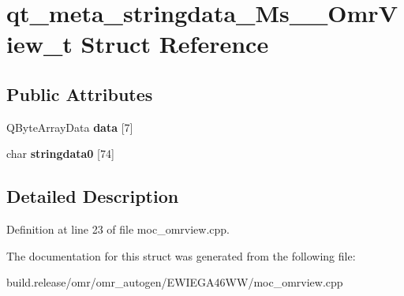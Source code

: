 \hypertarget{structqt__meta__stringdata___ms_____omr_view__t}{}\section{qt\+\_\+meta\+\_\+stringdata\+\_\+\+Ms\+\_\+\+\_\+\+Omr\+View\+\_\+t Struct Reference}
\label{structqt__meta__stringdata___ms_____omr_view__t}
\subsection*{Public Attributes}
\begin{DoxyCompactItemize}
\item 
\mbox{\label{structqt__meta__stringdata___ms_____omr_view__t_a4c301e0b39d02dceb82f9a6101306863}} 
Q\+Byte\+Array\+Data {\bfseries data} \mbox{[}7\mbox{]}
\item 
\mbox{\label{structqt__meta__stringdata___ms_____omr_view__t_ae32644befb5b959052d218ae6d5b726e}} 
char {\bfseries stringdata0} \mbox{[}74\mbox{]}
\end{DoxyCompactItemize}


\subsection{Detailed Description}


Definition at line 23 of file moc\+\_\+omrview.\+cpp.



The documentation for this struct was generated from the following file\+:\begin{DoxyCompactItemize}
\item 
build.\+release/omr/omr\+\_\+autogen/\+E\+W\+I\+E\+G\+A46\+W\+W/moc\+\_\+omrview.\+cpp\end{DoxyCompactItemize}
